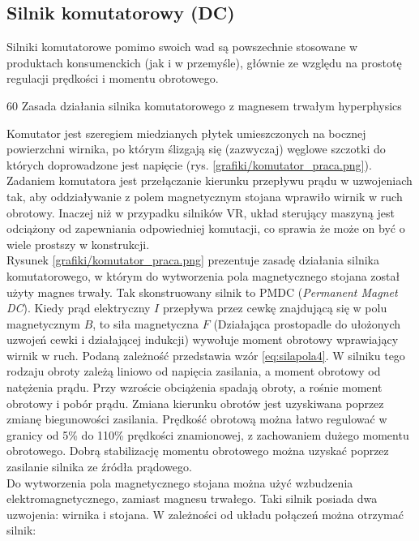 \subsection{Silnik komutatorowy (DC)}

Silniki komutatorowe pomimo swoich wad są powszechnie stosowane w produktach konsumenckich (jak i w przemyśle), głównie ze względu na prostotę regulacji prędkości i momentu obrotowego. 

		{60}
		{Zasada działania silnika komutatorowego z magnesem trwałym}
		{hyperphysics}

Komutator jest szeregiem miedzianych płytek umieszczonych na bocznej powierzchni wirnika, po którym ślizgają się (zazwyczaj) węglowe szczotki do których doprowadzone jest napięcie (rys. \ref{grafiki/komutator_praca.png}). Zadaniem komutatora jest przełączanie kierunku przepływu prądu w uzwojeniach tak, aby oddziaływanie z polem magnetycznym stojana wprawiło wirnik w ruch obrotowy. Inaczej niż w przypadku silników VR, układ sterujący maszyną jest odciążony od zapewniania odpowiedniej komutacji, co sprawia że może on być o wiele prostszy w konstrukcji. \\

Rysunek \ref{grafiki/komutator_praca.png} prezentuje zasadę działania silnika komutatorowego, w którym do wytworzenia pola magnetycznego stojana został użyty magnes trwały. Tak skonstruowany silnik to PMDC ({\it Permanent Magnet DC}). Kiedy prąd elektryczny $ I $ przepływa przez cewkę znajdującą się w polu magnetycznym $ B $, to siła magnetyczna $ F $ (Działająca prostopadle do ułożonych uzwojeń cewki i działającej indukcji)  wywołuje moment obrotowy wprawiający wirnik w ruch. Podaną zależność przedstawia wzór \ref{eq:silapola4}. W silniku tego rodzaju obroty zależą liniowo od napięcia zasilania, a moment obrotowy od natężenia prądu. Przy wzroście obciążenia spadają obroty, a rośnie moment obrotowy i pobór prądu. Zmiana kierunku obrotów jest uzyskiwana poprzez zmianę biegunowości zasilania. Prędkość obrotową można łatwo regulować w granicy od 5\% do 110\% prędkości znamionowej, z zachowaniem dużego momentu obrotowego. Dobrą stabilizację momentu obrotowego można uzyskać poprzez zasilanie silnika ze źródła prądowego. \\

Do wytworzenia pola magnetycznego stojana można użyć wzbudzenia elektromagnetycznego, zamiast magnesu trwałego. Taki silnik posiada dwa uzwojenia: wirnika i stojana. W zależności od układu połączeń można otrzymać silnik:


